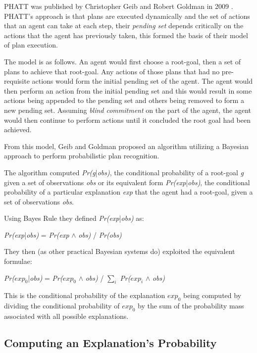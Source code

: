 \documentclass[parskip]{cs4rep}
\begin{document}
PHATT was published by Christopher Geib and Robert Goldman in 2009 \cite{Geib:2009:PPR:1550966.1551246}. PHATT's approach is that plans are executed dynamically and the set of actions that an agent can take at each step, their \textit{pending set} depends critically on the actions that the agent has previously taken, this formed the basis of their model of plan execution.

The model is as follows. An agent would first choose a root-goal, then a set of plans to achieve that root-goal. Any actions of those plans that had no pre-requisite actions would form the initial pending set of the agent. The agent would then perform an action from the initial pending set and this would result in some actions being appended to the pending set and others being removed to form a new pending set. Assuming \textit{blind commitment} on the part of the agent, the agent would then continue to perform actions until it concluded the root goal had been achieved.

From this model, Geib and Goldman proposed an algorithm utilizing a Bayesian approach to perform probabilistic plan recognition. 

The algorithm computed \textit{Pr(g}|\textit{obs)}, the conditional probability of a root-goal \textit{g} given a set of observations \textit{obs} or its equivalent form \textit{Pr(exp}|\textit{obs)}, the conditional probability of a particular explanation \textit{exp} that the agent had a root-goal, given a set of observations \textit{obs}.

Using Bayes Rule they defined \textit{Pr(exp}|\textit{obs)} as:\newline

\centerline{
\textit{Pr(exp}|\textit{obs)} = \textit{Pr(exp} $\wedge$ \textit{obs)} / \textit{Pr(obs)}
}

They then (as other practical Bayesian systems do) exploited the equivalent formulae:\newline

\centerline{
\textit{Pr($exp_0$}|\textit{obs)} = \textit{Pr($exp_0$} $\wedge$ \textit{obs)} / $\displaystyle\sum\nolimits_{i}$ \textit{Pr($exp_i$} $\wedge$ \textit{obs)}
}

This is the conditional probability of the explanation $exp_0$ being computed by dividing the conditional probability of $exp_0$  by the sum of the probability mass associated with all possible explanations.

\subsection{Computing an Explanation's Probability}
\end{document}
